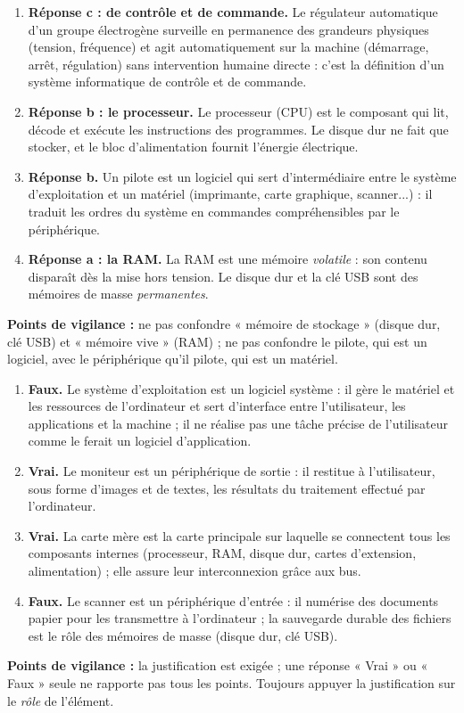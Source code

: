 \documentclass[11pt]{article}
\newcommand{\cle}[1]{{\popxbold\color{popdark}#1}}
\begin{document}
\begin{corrige}
\begin{enumerate}
\item \textbf{Réponse c : de contrôle et de commande.} Le régulateur automatique d'un groupe électrogène surveille en permanence des grandeurs physiques (tension, fréquence) et agit automatiquement sur la machine (démarrage, arrêt, régulation) sans intervention humaine directe : c'est la définition d'un système informatique de \cle{contrôle et de commande}.
\item \textbf{Réponse b : le processeur.} Le processeur (CPU) est le composant qui lit, décode et exécute les instructions des programmes. Le disque dur ne fait que stocker, et le bloc d'alimentation fournit l'énergie électrique.
\item \textbf{Réponse b.} Un pilote est un \cle{logiciel} qui sert d'intermédiaire entre le système d'exploitation et un matériel (imprimante, carte graphique, scanner...) : il traduit les ordres du système en commandes compréhensibles par le périphérique.
\item \textbf{Réponse a : la RAM.} La RAM est une mémoire \emph{volatile} : son contenu disparaît dès la mise hors tension. Le disque dur et la clé USB sont des mémoires de masse \emph{permanentes}.
\end{enumerate}
\textbf{Points de vigilance :} ne pas confondre « mémoire de stockage » (disque dur, clé USB) et « mémoire vive » (RAM) ; ne pas confondre le pilote, qui est un logiciel, avec le périphérique qu'il pilote, qui est un matériel.
\end{corrige}

\begin{corrige}
\begin{enumerate}
\item \textbf{Faux.} Le système d'exploitation est un \cle{logiciel système} : il gère le matériel et les ressources de l'ordinateur et sert d'interface entre l'utilisateur, les applications et la machine ; il ne réalise pas une tâche précise de l'utilisateur comme le ferait un logiciel d'application.
\item \textbf{Vrai.} Le moniteur est un périphérique de \cle{sortie} : il restitue à l'utilisateur, sous forme d'images et de textes, les résultats du traitement effectué par l'ordinateur.
\item \textbf{Vrai.} La \cle{carte mère} est la carte principale sur laquelle se connectent tous les composants internes (processeur, RAM, disque dur, cartes d'extension, alimentation) ; elle assure leur interconnexion grâce aux \cle{bus}.
\item \textbf{Faux.} Le scanner est un périphérique d'\cle{entrée} : il numérise des documents papier pour les transmettre à l'ordinateur ; la sauvegarde durable des fichiers est le rôle des mémoires de masse (disque dur, clé USB).
\end{enumerate}
\textbf{Points de vigilance :} la justification est exigée ; une réponse « Vrai » ou « Faux » seule ne rapporte pas tous les points. Toujours appuyer la justification sur le \emph{rôle} de l'élément.
\end{corrige}
\end{document}
